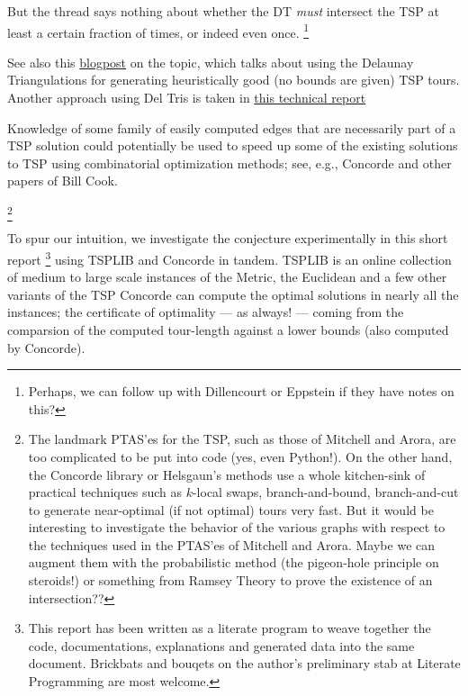 \begin{description}
     But the thread says nothing about whether the DT \textit{must} intersect the TSP at least a certain fraction of times, or indeed even once. \footnote{Perhaps, we can follow up with Dillencourt or Eppstein if they have notes on this?}

     See also this \href{https://web.colby.edu/thegeometricviewpoint/2015/03/09/delauney-triangulations-and-the-traveling-salesman/}{blogpost} on the topic, which 
     talks about using the Delaunay Triangulations for generating heuristically good (no bounds are given) TSP tours. Another approach using Del Tris
     is taken in \href{https://www.researchgate.net/publication/215753374_An_On_log_n_Heuristic_for_the_Euclidean_Traveling_Salesman_Problem}{this technical report} 

     Knowledge of some family of easily computed edges that are necessarily part of a TSP solution could potentially be used to speed up some 
     of the existing solutions to TSP using combinatorial optimization methods; see, e.g., Concorde \cite{applegate2009certification} and other papers of Bill Cook.

     \footnote{The landmark PTAS'es for the TSP, such as those of Mitchell \cite{mitchell1999guillotine} and Arora\cite{arora1996polynomial},  are too complicated to be put into code (yes, even Python!). On the other hand, the Concorde library \cite{applegate2009certification} or Helsgaun's methods\cite{helsgaun2000effective}  use a whole kitchen-sink of practical techniques such as $k$-local swaps, branch-and-bound, branch-and-cut to generate  near-optimal (if not optimal) tours very fast. But it would be interesting to investigate the behavior of the various graphs with respect to the techniques used in the PTAS'es of Mitchell and Arora. Maybe we can augment them with the probabilistic method (the pigeon-hole principle on steroids!) or something from Ramsey Theory to prove the existence of an intersection??}

     To spur our intuition,  we investigate the conjecture experimentally in this short report 
     \footnote{This report has been written as a literate program \cite{knuth1984literate,ramsey2008noweb} to weave together the code, documentations, explanations and generated data into the same document. Brickbats and bouqets on the author's preliminary stab at Literate Programming are most welcome.}
     using TSPLIB and Concorde in tandem. TSPLIB \cite{reinelt1991tsplib} is an online collection of medium to large scale instances of the Metric, the Euclidean and a few other variants of the TSP 
     Concorde can compute the optimal solutions in nearly all the instances; the certificate of optimality --- as always! --- coming from the comparsion of the computed tour-length against 
     a lower bounds (also computed by Concorde).


\end{description}
